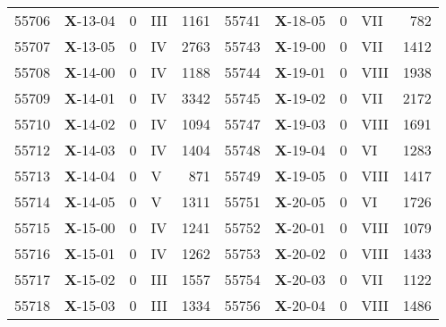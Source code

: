 \begin{table*}
\begin{tabular}{llllrllllr}
55706&\textbf{X}-13-04&0&III&1161&55741&\textbf{X}-18-05&0&VII&782\\
55707&\textbf{X}-13-05&0&IV&2763&55743&\textbf{X}-19-00&0&VII&1412\\
55708&\textbf{X}-14-00&0&IV&1188&55744&\textbf{X}-19-01&0&VIII&1938\\
55709&\textbf{X}-14-01&0&IV&3342&55745&\textbf{X}-19-02&0&VII&2172\\
55710&\textbf{X}-14-02&0&IV&1094&55747&\textbf{X}-19-03&0&VIII&1691\\
55712&\textbf{X}-14-03&0&IV&1404&55748&\textbf{X}-19-04&0&VI&1283\\
55713&\textbf{X}-14-04&0&V&871&55749&\textbf{X}-19-05&0&VIII&1417\\
55714&\textbf{X}-14-05&0&V&1311&55751&\textbf{X}-20-05&0&VI&1726\\
55715&\textbf{X}-15-00&0&IV&1241&55752&\textbf{X}-20-01&0&VIII&1079\\
55716&\textbf{X}-15-01&0&IV&1262&55753&\textbf{X}-20-02&0&VIII&1433\\
55717&\textbf{X}-15-02&0&III&1557&55754&\textbf{X}-20-03&0&VII&1122\\
55718&\textbf{X}-15-03&0&III&1334&55756&\textbf{X}-20-04&0&VIII&1486\\
\hline
\hline
\end{tabular}
\end{table*}

